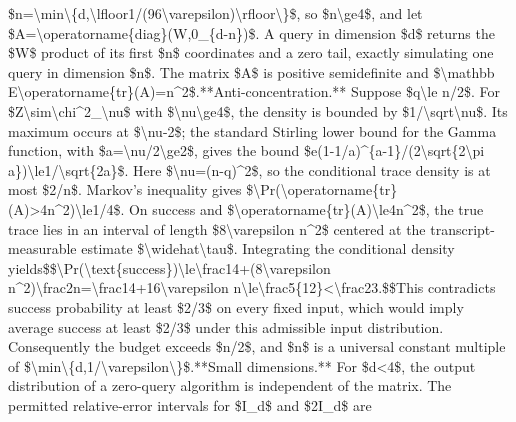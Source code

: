 \documentclass[10pt,a4paper]{article}
\begin{document}
\$n=\allowbreak{}\textbackslash{}min\textbackslash{}\{d,\allowbreak{}\textbackslash{}lfloor1/\allowbreak{}(96\textbackslash{}varepsilon)\textbackslash{}rfloor\textbackslash{}\}\$,\allowbreak{} so \$n\textbackslash{}ge4\$,\allowbreak{} and let \$A=\allowbreak{}\textbackslash{}operatorname\{diag\}(W,\allowbreak{}0\_\allowbreak{}\{d-n\})\$. A query in dimension \$d\$ returns the \$W\$ product of its first \$n\$ coordinates and a zero tail,\allowbreak{} exactly simulating one query in dimension \$n\$. The matrix \$A\$ is positive semidefinite and \$\textbackslash{}mathbb E\textbackslash{}operatorname\{tr\}(A)=\allowbreak{}n\textasciicircum{}2\$.\newline{}\newline{}**Anti-concentration.** Suppose \$q\textbackslash{}le n/\allowbreak{}2\$. For \$Z\textbackslash{}sim\textbackslash{}chi\textasciicircum{}2\_\allowbreak{}\textbackslash{}nu\$ with \$\textbackslash{}nu\textbackslash{}ge4\$,\allowbreak{} the density is bounded by \$1/\allowbreak{}\textbackslash{}sqrt\textbackslash{}nu\$. Its maximum occurs at \$\textbackslash{}nu-2\$;\allowbreak{} the standard Stirling lower bound for the Gamma function,\allowbreak{} with \$a=\allowbreak{}\textbackslash{}nu/\allowbreak{}2\textbackslash{}ge2\$,\allowbreak{} gives the bound \$e(1-1/\allowbreak{}a)\textasciicircum{}\{a-1\}/\allowbreak{}(2\textbackslash{}sqrt\{2\textbackslash{}pi a\})\textbackslash{}le1/\allowbreak{}\textbackslash{}sqrt\{2a\}\$. Here \$\textbackslash{}nu=\allowbreak{}(n-q)\textasciicircum{}2\$,\allowbreak{} so the conditional trace density is at most \$2/\allowbreak{}n\$. Markov's inequality gives \$\textbackslash{}Pr(\textbackslash{}operatorname\{tr\}(A)>4n\textasciicircum{}2)\textbackslash{}le1/\allowbreak{}4\$. On success and \$\textbackslash{}operatorname\{tr\}(A)\textbackslash{}le4n\textasciicircum{}2\$,\allowbreak{} the true trace lies in an interval of length \$8\textbackslash{}varepsilon n\textasciicircum{}2\$ centered at the transcript-measurable estimate \$\textbackslash{}widehat\textbackslash{}tau\$. Integrating the conditional density yields\newline{}\$\$\textbackslash{}Pr(\textbackslash{}text\{success\})\textbackslash{}le\textbackslash{}frac14+(8\textbackslash{}varepsilon n\textasciicircum{}2)\textbackslash{}frac2n=\allowbreak{}\textbackslash{}frac14+16\textbackslash{}varepsilon n\textbackslash{}le\textbackslash{}frac5\{12\}<\textbackslash{}frac23.\$\$\newline{}This contradicts success probability at least \$2/\allowbreak{}3\$ on every fixed input,\allowbreak{} which would imply average success at least \$2/\allowbreak{}3\$ under this admissible input distribution. Consequently the budget exceeds \$n/\allowbreak{}2\$,\allowbreak{} and \$n\$ is a universal constant multiple of \$\textbackslash{}min\textbackslash{}\{d,\allowbreak{}1/\allowbreak{}\textbackslash{}varepsilon\textbackslash{}\}\$.\newline{}\newline{}**Small dimensions.** For \$d<4\$,\allowbreak{} the output distribution of a zero-query algorithm is independent of the matrix. The permitted relative-error intervals for \$I\_\allowbreak{}d\$ and \$2I\_\allowbreak{}d\$ are 
\end{document}
